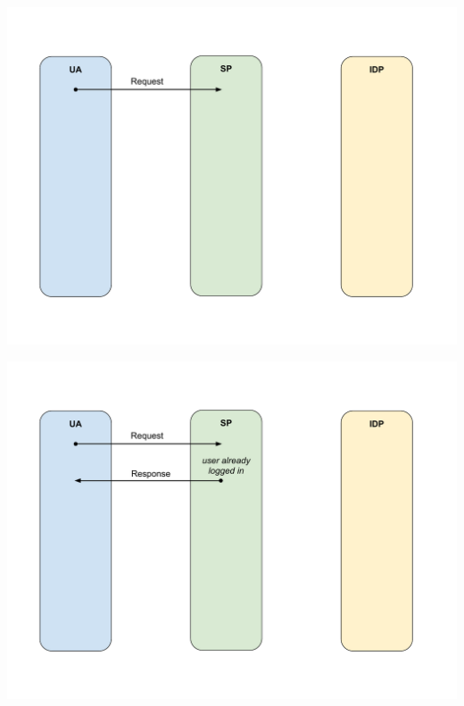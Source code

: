 \documentclass[ignorenonframetext,aspectratio=169]{beamer}
\begin{document}
\begin{frame}[plain]
\centering
\includegraphics[height=\paperheight]{fedsso-proto-1.pdf}
\end{frame}

\begin{frame}[plain]
\centering
\includegraphics[height=\paperheight]{fedsso-proto-2-logged-in.pdf}
\end{frame}
\end{document}
